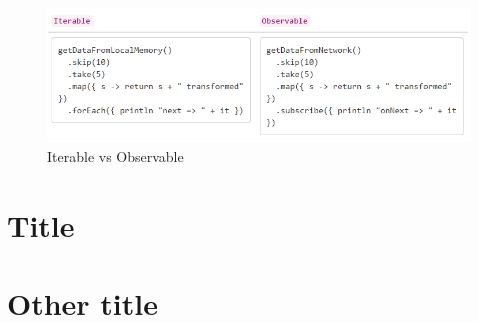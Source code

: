 \documentclass[12pt,a4paper,twoside]{report}
\begin{document}
\begin{figure}[h]
  \centering
  \includegraphics[width=\textwidth]{img/RX_iterable_vs_observable.PNG}
  \caption{Iterable vs Observable}
  \label{fig:rx_obs_it}
\end{figure}









\section{Title}
\section{Other title}
\end{document}
